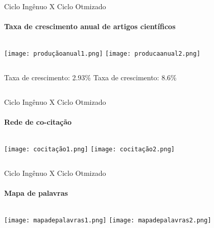 \begin{frame}[t]{Ciclo Ingênuo X Ciclo Otmizado}
    \transboxout[duration=0.5]
    \framesubtitle{Taxa de crescimento anual de artigos científicos}
    
    \begin{columns}
        \newline  
            \texttt{[image: produçãoanual1.png]}
        \newline  
         \texttt{[image: producaanual2.png]}
    \end{columns}
    
    \begin{columns}
        \newline  
        Taxa de crescimento: 2.93\%
        \newline
         Taxa de crescimento: 8.6\%
    \end{columns}
\end{frame}
\begin{frame}[t]{Ciclo Ingênuo X Ciclo Otmizado}
    \transboxout[duration=0.5]
    \framesubtitle{Rede de co-citação}
    
    \begin{columns}
        \newline  
            \texttt{[image: cocitação1.png]}
        \newline  
         \texttt{[image: cocitação2.png]}
    \end{columns}
    
\end{frame}
\begin{frame}[t]{Ciclo Ingênuo X Ciclo Otmizado}
    \transboxout[duration=0.5]
    \framesubtitle{Mapa de palavras}
    
    \begin{columns}
        \newline  
            \texttt{[image: mapadepalavras1.png]}
        \newline  
         \texttt{[image: mapadepalavras2.png]}
    \end{columns}
    
\end{frame}
